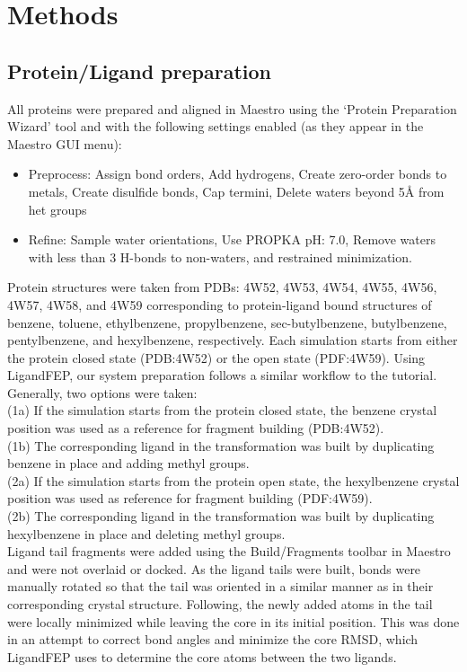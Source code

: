\documentclass[journal=jctcce,manuscript=article]{achemso}
\begin{document}
\section{Methods}
\subsection*{Protein/Ligand preparation}
All proteins were prepared and aligned in Maestro\cite{Maestro} using the `Protein Preparation Wizard'\cite{ProteinPrepWizSoftware,Epik,Impact,Prime,ProteinPrepWizPaper} tool and with the following settings enabled (as they appear in the Maestro GUI menu):
   \begin{itemize}
   \item Preprocess: Assign bond orders, Add hydrogens, Create zero-order bonds to metals, Create disulfide bonds, Cap termini, Delete waters beyond 5\AA{} from het groups
   \item Refine: Sample water orientations, Use PROPKA pH: 7.0, Remove waters with less than 3 H-bonds to non-waters, and restrained minimization.
   \end{itemize}

Protein structures were taken from PDBs: 4W52, 4W53, 4W54, 4W55, 4W56, 4W57, 4W58, and 4W59 corresponding to protein-ligand bound structures of benzene, toluene, ethylbenzene, propylbenzene, sec-butylbenzene, butylbenzene, pentylbenzene, and hexylbenzene, respectively\cite{Merski2015}.
Each simulation starts from either the protein closed state (PDB:4W52) or the open state (PDF:4W59).
Using LigandFEP, our system preparation follows a similar workflow to the tutorial\cite{LigandFEP}.
Generally, two options were taken:\\
(1a) If the simulation starts from the protein closed state, the benzene crystal position was used as a reference for fragment building (PDB:4W52).\\
(1b) The corresponding ligand in the transformation was built by duplicating benzene in place and adding methyl groups.\\
(2a) If the simulation starts from the protein open state, the hexylbenzene crystal position was used as reference for fragment building (PDF:4W59).\\
(2b) The corresponding ligand in the transformation was built by duplicating hexylbenzene in place and deleting methyl groups.\\
Ligand tail fragments were added using the Build/Fragments toolbar in Maestro  and were not overlaid or docked. 
As the ligand tails were built, bonds were manually rotated so that the tail was oriented in a similar manner as in their corresponding crystal structure.
Following, the newly added atoms in the tail were locally minimized while leaving the core in its initial position.
This was done in an attempt to correct bond angles and minimize the core RMSD, which LigandFEP uses to determine the core atoms between the two ligands.
\end{document}
